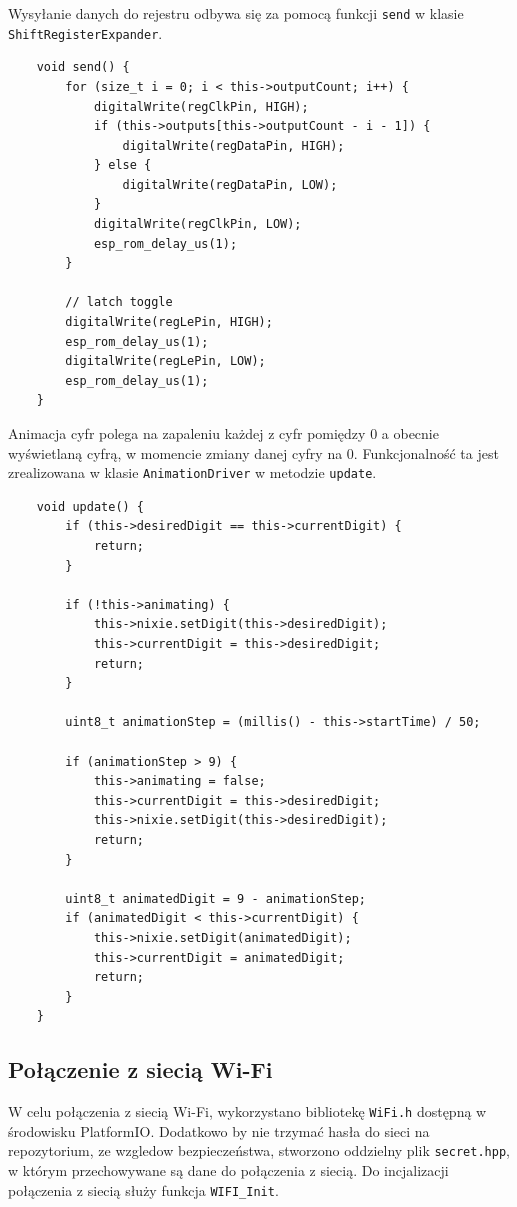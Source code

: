 \documentclass[../main.tex]{subfiles}
\begin{document}
Wysyłanie danych do rejestru odbywa się za pomocą funkcji \texttt{send} w klasie \texttt{ShiftRegisterExpander}.

\begin{verbatim}
    void send() {
        for (size_t i = 0; i < this->outputCount; i++) {
            digitalWrite(regClkPin, HIGH);
            if (this->outputs[this->outputCount - i - 1]) {
                digitalWrite(regDataPin, HIGH);
            } else {
                digitalWrite(regDataPin, LOW);
            }
            digitalWrite(regClkPin, LOW);
            esp_rom_delay_us(1);
        }

        // latch toggle
        digitalWrite(regLePin, HIGH);
        esp_rom_delay_us(1);
        digitalWrite(regLePin, LOW);
        esp_rom_delay_us(1);
    }
\end{verbatim}


Animacja cyfr polega na zapaleniu każdej z cyfr pomiędzy 0 a obecnie wyświetlaną cyfrą, w momencie zmiany danej cyfry na 0.
Funkcjonalność ta jest zrealizowana w klasie \texttt{AnimationDriver} w metodzie \texttt{update}.

\begin{verbatim}
    void update() {
        if (this->desiredDigit == this->currentDigit) {
            return;
        }

        if (!this->animating) {
            this->nixie.setDigit(this->desiredDigit);
            this->currentDigit = this->desiredDigit;
            return;
        }

        uint8_t animationStep = (millis() - this->startTime) / 50;

        if (animationStep > 9) {
            this->animating = false;
            this->currentDigit = this->desiredDigit;
            this->nixie.setDigit(this->desiredDigit);
            return;
        }

        uint8_t animatedDigit = 9 - animationStep;
        if (animatedDigit < this->currentDigit) {
            this->nixie.setDigit(animatedDigit);
            this->currentDigit = animatedDigit;
            return;
        }
    }
\end{verbatim}

\subsection{Połączenie z siecią Wi-Fi}
W celu połączenia z siecią Wi-Fi, wykorzystano bibliotekę \texttt{WiFi.h} dostępną w środowisku PlatformIO. Dodatkowo by nie trzymać hasła do sieci na repozytorium, ze wzgledow bezpieczeństwa,
stworzono oddzielny plik \texttt{secret.hpp}, w którym przechowywane są dane do połączenia z siecią. Do incjalizacji połączenia z siecią służy funkcja \texttt{WIFI\_Init}.
\end{document}
